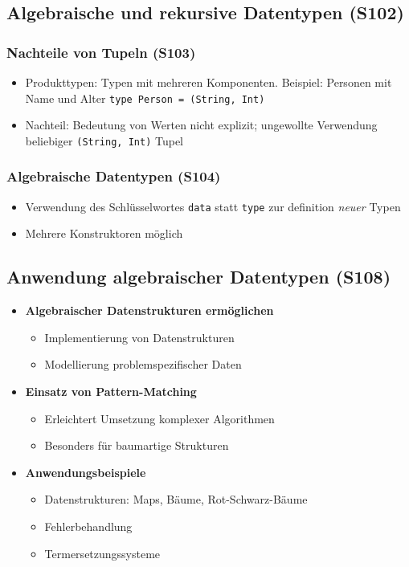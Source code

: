 \subsection{Algebraische und rekursive Datentypen (S102)}

\subsubsection{Nachteile von Tupeln (S103)}
\begin{itemize}
	\item Produkttypen: Typen mit mehreren Komponenten. Beispiel: Personen mit Name und Alter \texttt{type Person = (String, Int)}
	\item Nachteil: Bedeutung von Werten nicht explizit; ungewollte Verwendung beliebiger \texttt{(String, Int)} Tupel
\end{itemize}

\subsubsection{Algebraische Datentypen (S104)}
\begin{itemize}
	\item Verwendung des Schlüsselwortes \texttt{data} statt \texttt{type} zur definition \textit{neuer} Typen
	\item Mehrere Konstruktoren möglich
\end{itemize}

\subsection{Anwendung algebraischer Datentypen (S108)}
\begin{itemize}
	\item \textbf{Algebraischer Datenstrukturen ermöglichen}
	\begin{itemize}
		\item Implementierung von Datenstrukturen
		\item Modellierung problemspezifischer Daten
	\end{itemize}
	\item \textbf{Einsatz von Pattern-Matching}
	\begin{itemize}
		\item Erleichtert Umsetzung komplexer Algorithmen
		\item Besonders für baumartige Strukturen
	\end{itemize}
	\item \textbf{Anwendungsbeispiele}
	\begin{itemize}
		\item Datenstrukturen: Maps, Bäume, Rot-Schwarz-Bäume
		\item Fehlerbehandlung
		\item Termersetzungssysteme
	\end{itemize}
\end{itemize}



